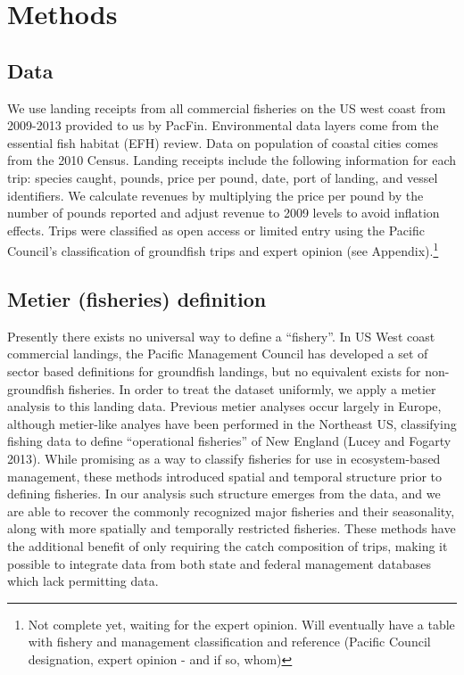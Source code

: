 \documentclass[]{article}
\let\rmarkdownfootnote\footnote%
\def\footnote{\protect\rmarkdownfootnote}
\begin{document}
\section{Methods}\label{methods}

\subsection{Data}\label{data}

We use landing receipts from all commercial fisheries on the US west
coast from 2009-2013 provided to us by PacFin. Environmental data layers
come from the essential fish habitat (EFH) review. Data on population of
coastal cities comes from the 2010 Census. Landing receipts include the
following information for each trip: species caught, pounds, price per
pound, date, port of landing, and vessel identifiers. We calculate
revenues by multiplying the price per pound by the number of pounds
reported and adjust revenue to 2009 levels to avoid inflation effects.
Trips were classified as open access or limited entry using the Pacific
Council's classification of groundfish trips and expert opinion (see
Appendix).\footnote{Not complete yet, waiting for the expert opinion.
  Will eventually have a table with fishery and management
  classification and reference (Pacific Council designation, expert
  opinion - and if so, whom)}

\subsection{Metier (fisheries)
definition}\label{metier-fisheries-definition}

Presently there exists no universal way to define a ``fishery''. In US
West coast commercial landings, the Pacific Management Council has
developed a set of sector based definitions for groundfish landings, but
no equivalent exists for non-groundfish fisheries. In order to treat the
dataset uniformly, we apply a metier analysis to this landing data.
Previous metier analyses occur largely in Europe, although metier-like
analyes have been performed in the Northeast US, classifying fishing
data to define ``operational fisheries'' of New England (Lucey and
Fogarty 2013). While promising as a way to classify fisheries for use in
ecosystem-based management, these methods introduced spatial and
temporal structure prior to defining fisheries. In our analysis such
structure emerges from the data, and we are able to recover the commonly
recognized major fisheries and their seasonality, along with more
spatially and temporally restricted fisheries. These methods have the
additional benefit of only requiring the catch composition of trips,
making it possible to integrate data from both state and federal
management databases which lack permitting data.
\end{document}
